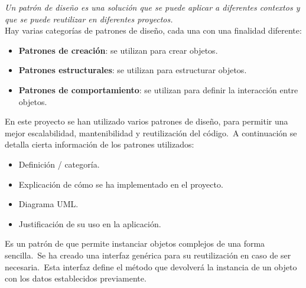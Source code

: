 
\textit{Un patrón de diseño es una solución que se puede aplicar a diferentes contextos y que se
puede reutilizar en diferentes proyectos.} \\
Hay varias categorías de patrones de diseño, cada una con una finalidad diferente:
\begin{itemize}
	\item \textbf{Patrones de creación}: se utilizan para crear objetos.
	\item \textbf{Patrones estructurales}: se utilizan para estructurar objetos.
	\item \textbf{Patrones de comportamiento}: se utilizan para definir la interacción entre objetos.
\end{itemize}
\label{itm:categorías-patrones}

En este proyecto se han utilizado varios patrones de diseño, para permitir una mejor escalabilidad, mantenibilidad y
reutilización del código.\ A continuación se detalla cierta información de los patrones utilizados:
\begin{itemize}
	\item Definición / categoría.
	\item Explicación de cómo se ha implementado en el proyecto.
	\item Diagrama UML\@.
	\item Justificación de su uso en la aplicación.
\end{itemize}
\label{itm:uso-patrones}

Es un patrón de  que permite instanciar objetos complejos de una forma sencilla.\ Se ha creado una
interfaz  genérica para su reutilización en caso de ser necesaria.\ Esta interfaz define el
método  que devolverá la instancia de un objeto con los datos establecidos previamente.

\begin{center}
\end{center}

